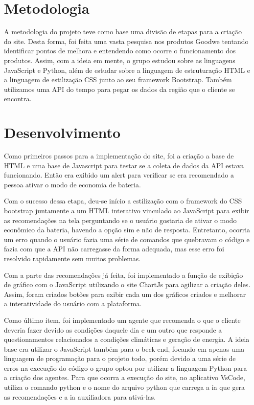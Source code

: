 \documentclass{tcc}
\begin{document}
\newpage
\section{Metodologia}
A metodologia do projeto teve como base uma divisão de etapas para a criação do site. Desta forma, foi feita uma vasta pesquisa nos produtos Goodwe tentando identificar pontos de melhora e entendendo como ocorre o funcionamento dos produtos. Assim, com a ideia em mente, o grupo estudou sobre as linguagens JavaScript e Python, além de estudar sobre a linguagem de estruturação HTML e a linguagem de estilização CSS junto ao seu framework Bootstrap. Também utilizamos uma API do tempo para pegar os dados da região que o cliente se encontra.
\newpage
\section{Desenvolvimento}
Como primeiros passos para a implementação do site, foi a criação a base de HTML e uma base de Javascript para testar se a coleta de dados da API estava funcionando. Então era exibido um alert para verificar se era recomendado a pessoa ativar o modo de economia de bateria.


Com o sucesso dessa etapa, deu-se início a estilização com o framework do CSS bootstrap juntamente a um HTML interativo vinculado ao JavaScript para exibir as recomendações na tela perguntando se o usuário gostaria de ativar o modo econômico da bateria, havendo a opção sim e não de resposta. Entretanto, ocorria um erro quando o usuário fazia uma série de comandos que quebravam o código e fazia com que a API não carregasse da forma adequada, mas esse erro foi resolvido rapidamente sem muitos problemas.


Com a parte das recomendações já feita, foi implementado a função de exibição de gráfico com o JavaScript utilizando o site ChartJs para agilizar a criação deles. Assim, foram criados botões para exibir cada um dos gráficos criados e melhorar a interatividade do usuário com a plataforma.


Como último item, foi implementado um agente que recomenda o que o cliente deveria fazer devido as condições daquele dia e um outro que responde a questionamentos relacionados a condições climáticas e geração de energia. A ideia base era utilizar o JavaScript também para o beck-end, focando em apenas uma linguagem de programação para o projeto todo, porém devido a uma série de erros na execução do código o grupo optou por utilizar a linguagem Python para a criação dos agentes.
Para que ocorra a execução do site, no aplicativo VsCode, utiliza o comando python e o nome do arquivo python que carrega a ia que gera as recomendações e a ia auxiliadora para ativá-las.
\end{document}
